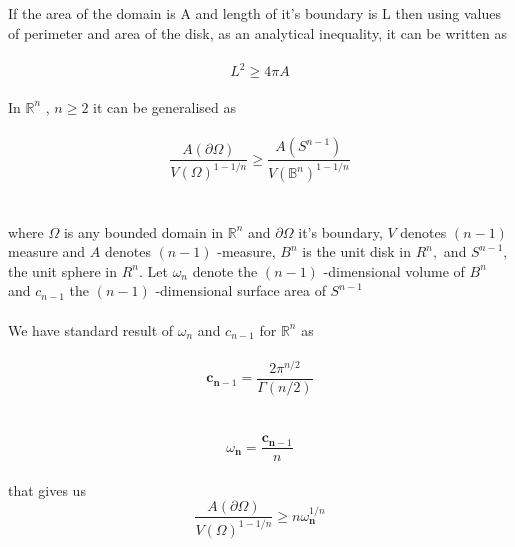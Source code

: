 \documentclass[oneside]{book}
\begin{document}
    If the area of the domain is A and length of it's boundary is L then using values of perimeter and area of the disk,
    as an analytical inequality, it can be written as \\\\
    \begin{equation}
    \label{eq5}  
    L^{2} \geq 4 \pi A
        \end{equation}
      \\
        In $\mathbb{R}^{n}$ 
        , $n \geq 2$  it can be generalised as
        \\\\
       \begin{equation}
       \label{eq6}  
             \frac{A(\partial \Omega)}{V(\Omega)^{1-1 / n}} \geq \frac{A\left(S^{n-1}\right)}{V\left(\mathbb{B}^{n}\right)^{1-1 / n}}
          \end{equation} \\\\
        where $\Omega$ is any bounded domain in $\mathbb{R}^{n}$ and $\partial \Omega$ it's boundary, $V$ denotes $(n-1)$
measure and $A$ denotes $(n-1)$ -measure, $B^{n}$ is the unit disk in $R^{n},$ and $S^{n-1}$,
the unit sphere in $R^{n}$.
Let $\omega_{n}$ denote the $(n-1)$ -dimensional volume of $B^{n}$ and  $c_{n-1}$ the $(n-1)$ -dimensional surface area of $S^{n-1}$ \\\\



We have standard result of $\omega_{n}$ and $c_{n-1}$ for $\mathbb{R}^{n}$ as  \\\\
    \begin{equation}
    \label{eq7}  
\mathbf{c}_{\mathbf{n}-1} = \frac{2 \pi^{n / 2}}{\Gamma(n / 2)}
    \end{equation}
    \\\\
        \begin{equation}
        \label{eq8}  
 \omega_{\mathbf{n} } = \frac{\mathbf{c}_{\mathbf{n}-1}}{n}  
    \end{equation} \\
that gives us \\
    \begin{equation}
    \label{eq9}  
 \frac{A(\partial \Omega)}{V(\Omega)^{1-1 / n}} \geq n \omega_{\mathbf{n}}^{1 / n}
    \end{equation}
\end{document}
